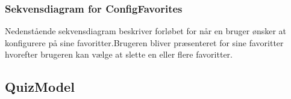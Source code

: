 
\subsubsection{Sekvensdiagram for ConfigFavorites}
Nedenstående sekvensdiagram beskriver forløbet for når en bruger ønsker at konfigurere på sine favoritter.Brugeren bliver præsenteret for sine favoritter hvorefter brugeren kan vælge at slette en eller flere favoritter.


\subsection{QuizModel}

